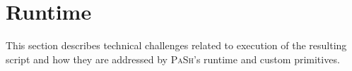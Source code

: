 \documentclass[sigplan, review, screen, anonymous]{acmart}
\newcommand{\todo}[1]{\hl{#1}\xspace}
\newcommand{\kk}[1]{[{\color{magenta}kk: #1}]}
\newcommand{\sys}{{\scshape PaSh}\xspace}
\begin{document}
\section{Runtime}
\label{impl}
\label{optimizer}


This section describes technical challenges related to execution of the resulting script and how they are addressed by \sys's runtime and custom primitives.






\end{document}
